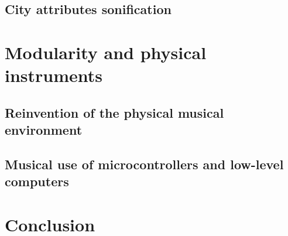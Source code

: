 \documentclass[11pt,a4paper,oneside]{report}
\begin{document}
\section{City attributes sonification}

\chapter{Modularity and physical instruments}
\section{Reinvention of the physical musical environment}
\section{Musical use of microcontrollers and low-level computers}

\chapter{Conclusion}



\end{document}
